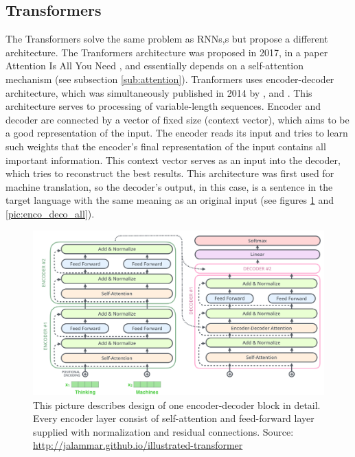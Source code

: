 \subsection{Transformers}
\label{sub:transformers}
The Transformers solve the same problem as RNNs,s but propose a different architecture. The Tranformers architecture was proposed in 2017, in a paper Attention Is All You Need \citep{Vaswani2017}, and essentially depends on a self-attention mechanism (see subsection \ref{sub:attention}). %
Tranformers uses encoder-decoder architecture, which was simultaneously published in 2014 by \citep{Cho2014}, \citep{Sutskever2014} and \citep{Wu2016}. This architecture serves to processing of variable-length sequences. Encoder and decoder are connected by a vector of fixed size (context vector), which aims to be a good representation of the input. %
The encoder reads its input and tries to learn such weights that the encoder's final representation of the input contains all important information. This context vector serves as an input into the decoder, which tries to reconstruct the best results. This architecture was first used for machine translation, so the decoder's output, in this case, is a sentence in the target language with the same meaning as an original input (see figures \ref{pic:enco_deco}  and \ref{pic:enco_deco_all}).
\begin{figure}[!h]
\centering
\includegraphics[width=1\columnwidth]{../img/trans_arch}
\protect\caption[The encoder-decoder block architecture in detail]{This picture describes design of one encoder-decoder block in detail. Every encoder layer consist of self-attention and feed-forward layer supplied with normalization and residual connections. Source: \url{http://jalammar.github.io/illustrated-transformer} }
\label{pic:enco_deco}
\end{figure}

